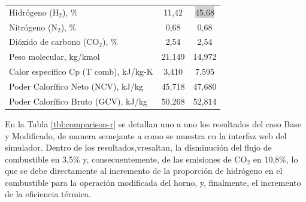 \begin{table}[H]
\begin{tabular}{l|c|c}
Hidrógeno (H$_2$), \% &11,42&\colorbox{lightgray}{45,68}\\
Nitrógeno (N$_2$), \%        &0,68   &0,68   \\
Dióxido de carbono (CO$_2$), \%&2,54 &2,54   \\
\hline
Peso molecular,  kg/kmol               &21,149 &14,972 \\
Calor específico Cp (T comb),  kJ/kg-K &3,410  &7,595  \\
Poder Calorífico Neto (NCV),  kJ/kg    &45,718 &47,680 \\
Poder Calorífico Bruto (GCV),  kJ/kg   &50,268 &52,814 \\
\end{tabular}
\end{table}

\par En la Tabla \ref{tbl:comparison-r} se detallan uno a uno los resultados del caso Base y Modificado, de manera semejante a como se muestra en la interfaz web del simulador. Dentro de los resultados,vresaltan, la disminución del flujo de combustible en 3,5\% y, consecuentemente, de las emisiones de CO$_2$ en 10,8\%, lo que se debe directamente al incremento de la proporción de hidrógeno en el combustible para la operación modificada del horno, y, finalmente, el incremento de la eficiencia térmica.

